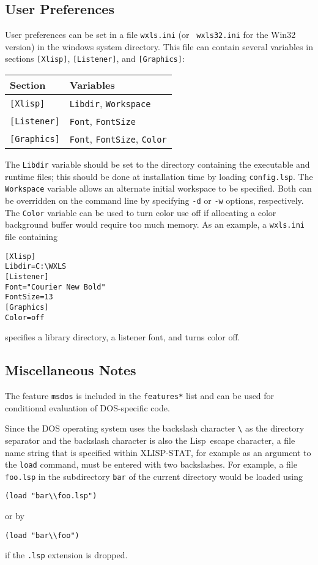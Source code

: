 \documentclass[11pt]{article}
\newcommand{\dcode}[1]{{\tt #1}}
\newcommand{\LS}{Lisp}
\newcommand{\XLS}{XLISP-STAT}
\newcommand{\WXLS}{WXLS}
\begin{document}
\subsection{User Preferences}
User preferences can be set in a file {\tt wxls.ini} (or {\tt
wxls32.ini} for the Win32 version) in the windows system directory.
This file can contain several variables in sections {\tt [Xlisp]},
{\tt [Listener]}, and {\tt [Graphics]}:
\begin{center}
  \begin{tabular}{ll}
    Section & Variables\\
    \hline
    {\tt [Xlisp]} & {\tt Libdir}, {\tt Workspace}\\
    {\tt [Listener]} & {\tt Font}, {\tt FontSize}\\
    {\tt [Graphics]} & {\tt Font}, {\tt FontSize}, {\tt Color}\\
    \hline
  \end{tabular}
\end{center}
The {\tt Libdir} variable should be set to the directory containing
the executable and runtime files; this should be done at installation
time by loading {\tt config.lsp}. The {\tt Workspace} variable allows
an alternate initial workspace to be specified. Both can be overridden
on the command line by specifying {\tt -d} or {\tt -w} options,
respectively. The {\tt Color} variable can be used to turn color use
off if allocating a color background buffer would require too much
memory. As an example, a {\tt wxls.ini} file containing
\begin{verbatim}
[Xlisp]
Libdir=C:\WXLS
[Listener]
Font="Courier New Bold"
FontSize=13
[Graphics]
Color=off
\end{verbatim}
specifies a library directory, a listener font, and turns color off.

\subsection{Miscellaneous Notes}
The feature \dcode{msdos} is included in the \dcode{*features*} list
and can be used for conditional evaluation of DOS-specific code.

Since the DOS operating system uses the backslash character \verb+\+
as the directory separator and the backslash character is also the
\LS\ escape character, a file name string that is specified within
\XLS, for example as an argument to the \dcode{load} command, must be
entered with two backslashes. For example, a file \dcode{foo.lsp} in
the subdirectory \dcode{bar} of the current directory would be loaded
using
\begin{verbatim}
(load "bar\\foo.lsp")
\end{verbatim}
or by
\begin{verbatim}
(load "bar\\foo")
\end{verbatim}
if the \dcode{.lsp} extension is dropped.
\end{document}
